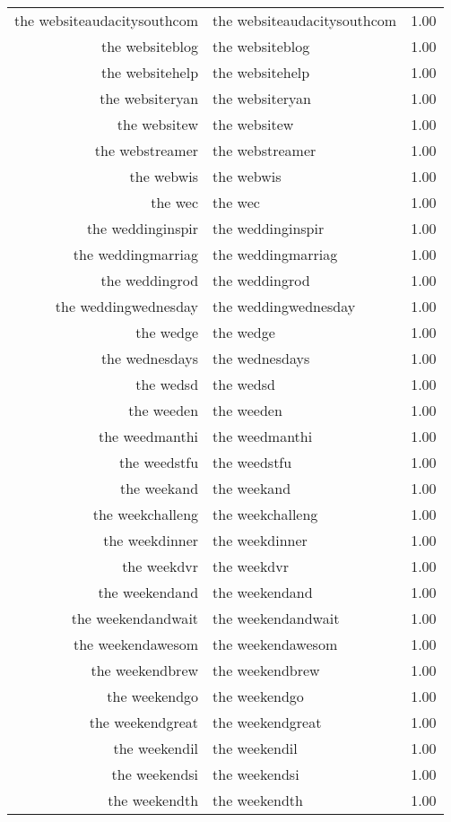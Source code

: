 \begin{table}[ht]
\begin{tabular}{rlr}
  the websiteaudacitysouthcom & the websiteaudacitysouthcom & 1.00 \\ 
  the websiteblog & the websiteblog & 1.00 \\ 
  the websitehelp & the websitehelp & 1.00 \\ 
  the websiteryan & the websiteryan & 1.00 \\ 
  the websitew & the websitew & 1.00 \\ 
  the webstreamer & the webstreamer & 1.00 \\ 
  the webwis & the webwis & 1.00 \\ 
  the wec & the wec & 1.00 \\ 
  the weddinginspir & the weddinginspir & 1.00 \\ 
  the weddingmarriag & the weddingmarriag & 1.00 \\ 
  the weddingrod & the weddingrod & 1.00 \\ 
  the weddingwednesday & the weddingwednesday & 1.00 \\ 
  the wedge & the wedge & 1.00 \\ 
  the wednesdays & the wednesdays & 1.00 \\ 
  the wedsd & the wedsd & 1.00 \\ 
  the weeden & the weeden & 1.00 \\ 
  the weedmanthi & the weedmanthi & 1.00 \\ 
  the weedstfu & the weedstfu & 1.00 \\ 
  the weekand & the weekand & 1.00 \\ 
  the weekchalleng & the weekchalleng & 1.00 \\ 
  the weekdinner & the weekdinner & 1.00 \\ 
  the weekdvr & the weekdvr & 1.00 \\ 
  the weekendand & the weekendand & 1.00 \\ 
  the weekendandwait & the weekendandwait & 1.00 \\ 
  the weekendawesom & the weekendawesom & 1.00 \\ 
  the weekendbrew & the weekendbrew & 1.00 \\ 
  the weekendgo & the weekendgo & 1.00 \\ 
  the weekendgreat & the weekendgreat & 1.00 \\ 
  the weekendil & the weekendil & 1.00 \\ 
  the weekendsi & the weekendsi & 1.00 \\ 
  the weekendth & the weekendth & 1.00 \\ 

\end{tabular}
\end{table}
